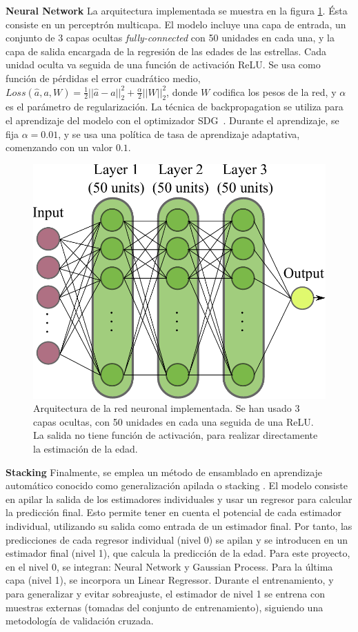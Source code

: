 \vspace{0.5cm}

\textbf{Neural Network} {} La arquitectura implementada se muestra en la figura \ref{fig:neural_network}. Ésta consiste en un perceptrón multicapa. El modelo incluye una capa de entrada, un conjunto de 3 capas ocultas \emph{fully-connected} con 50 unidades en cada una, y la capa de salida encargada de la regresión de las edades de las estrellas. Cada unidad oculta va seguida de una función de activación ReLU. Se usa como función de pérdidas el error cuadrático medio, $Loss(\hat{a},a,W) = \frac{1}{2}||\hat{a} - a ||_2^2 + \frac{\alpha}{2} ||W||_2^2$, donde $W$ codifica los pesos de la red, y $\alpha$ es el parámetro de regularización. La técnica de backpropagation \cite{LeCun2012} se utiliza para el aprendizaje del modelo con el optimizador SDG~\cite{sgd}. Durante el aprendizaje, se fija $\alpha=0.01$, y se usa una política de tasa de aprendizaje adaptativa, comenzando con un valor $0.1$.

\vspace{0.5cm}

\begin{figure}[H]
\begin{center}
\includegraphics[width=0.6\linewidth]{Figuras/nnet.pdf}
\end{center}
\caption{Arquitectura de la red neuronal implementada. Se han usado 3 capas ocultas, con 50 unidades en cada una seguida de una ReLU. La salida no tiene función de activación, para realizar directamente la estimación de la edad.}
\label{fig:neural_network}
\end{figure}

\textbf{Stacking} {} Finalmente, se emplea un método de ensamblado en aprendizaje automático conocido como generalización apilada o stacking \cite{Wolpert1992}. El modelo consiste en apilar la salida de los estimadores individuales y usar un regresor para calcular la predicción final. Esto permite tener en cuenta el potencial de cada estimador individual, utilizando su salida como entrada de un estimador final.  %
Por tanto, las predicciones de cada regresor individual (nivel 0) se apilan y se introducen en un estimador final (nivel 1), que calcula la predicción de la edad. Para este proyecto, en el nivel 0, se integran: Neural Network y Gaussian Process. Para la última capa (nivel 1), se incorpora un Linear Regressor. Durante el entrenamiento, y para generalizar y evitar sobreajuste, el estimador de nivel 1 se entrena con muestras externas (tomadas del conjunto de entrenamiento), siguiendo una metodología de validación cruzada.

